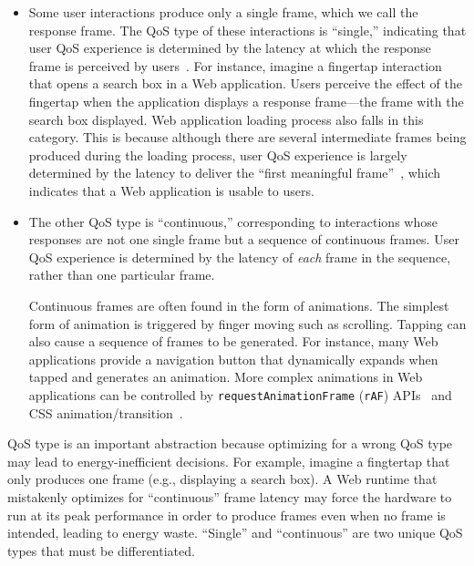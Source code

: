 \begin{itemize}
\item Some user interactions produce only a single frame, which we call the response frame. The QoS type of these interactions is ``single,'' indicating that user QoS experience is determined by the latency at which the response frame is perceived by users~\cite{eventlatency}. For instance, imagine a fingertap interaction that opens a search box in a Web application. Users perceive the effect of the fingertap when the application displays a response frame---the frame with the search box displayed. Web application loading process also falls in this category. This is because although there are several intermediate frames being produced during the loading process, user QoS experience is largely determined by the latency to deliver the ``first meaningful frame''~\cite{fmf}, which indicates that a Web application is usable to users.

\item The other QoS type is ``continuous,'' corresponding to interactions whose responses are not one single frame but a sequence of continuous frames. User QoS experience is determined by the latency of \textit{each} frame in the sequence, rather than one particular frame.

Continuous frames are often found in the form of animations. The simplest form of animation is triggered by finger moving such as scrolling. Tapping can also cause a sequence of frames to be generated. For instance, many Web applications provide a navigation button that dynamically expands when tapped and generates an animation. More complex animations in Web applications can be controlled by \texttt{requestAnimationFrame} (\texttt{rAF}) APIs~\cite{animationtiming} and CSS animation/transition~\cite{cssanimations,csstransitions}.
\end{itemize}

QoS type is an important abstraction because optimizing for a wrong QoS type may lead to energy-inefficient decisions. For example, imagine a fingtertap that only produces one frame  (e.g., displaying a search box). A Web runtime that mistakenly optimizes for ``continuous'' frame latency may force the hardware to run at its peak performance in order to produce frames even when no frame is intended, leading to energy waste. ``Single'' and ``continuous'' are two unique QoS types that must be differentiated.


